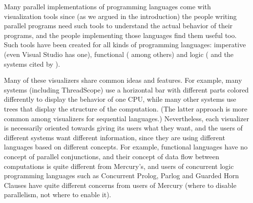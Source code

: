 % 
% 
% 
% 


Many parallel implementations of programming languages
come with visualization tools
since (as we argued in the introduction)
the people writing parallel programs
need such tools to understand the actual behavior of their programs,
and the people implementing those languages find them useful too.
Such tools have been created for all kinds of programming languages:
imperative (even Visual Studio has one),
functional
(\cite{edentraceviewer,loidl98:gransim,runciman93:profilingparfp} among others)
and logic (\cite{Foster96,vace}
and the systems cited by \cite{Gupta95parallelexecution}).

Many of these visualizers share common ideas and features.
For example, many systems (including ThreadScope)
use a horizontal bar with different parts colored differently
to display the behavior of one CPU,
while many other systems use trees
that display the structure of the computation.
(The latter approach is more common
among visualizers for sequential languages.)
Nevertheless, each visualizer is necessarily oriented
towards giving its users what they want,
and the users of different systems want different information,
since they are using different languages based on different concepts.
For example, functional languages have no concept of parallel conjunctions,
and their concept of data flow between computations
is quite different from Mercury's,
and users of concurrent logic programming languages
such as Concurrent Prolog, Parlog and Guarded Horn Clauses
have quite different concerns from users of Mercury
(where to disable parallelism, not where to enable it).

